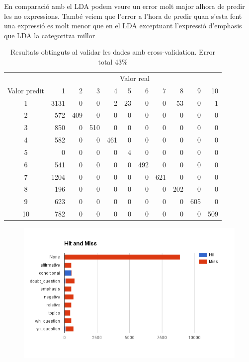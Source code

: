 \documentclass[a4paper]{article}
\begin{document}
En comparació amb el LDA podem veure un error molt major alhora de predir les no expressions. També veiem que l’error a l’hora de predir quan s’esta fent una expressió es molt menor que en el LDA exceptuant l’expressió d’emphasis que LDA la categoritza millor

\begin{table}[H]
	\centering
	\def\arraystretch{1.2}
	\begin{tabular}{|c|rrrrrrrrrr|}
		\hline
		& \multicolumn{10}{c|}{Valor real} \\
		Valor predit & 1 & 2 & 3 & 4 & 5 & 6 & 7 & 8 & 9 & 10 \\
		\hline
		1 & 3131 & 0 & 0 & 2 & 23 & 0 & 0 & 53 & 0 & 1 \\
		2 & 572 & 409 & 0 & 0 & 0 & 0 & 0 & 0 & 0 & 0 \\
		3 & 850 & 0 & 510 & 0 & 0 & 0 & 0 & 0 & 0 & 0 \\
		4 & 582 & 0 & 0 & 461 & 0 & 0 & 0 & 0 & 0 & 0 \\
		5 & 0 & 0 & 0 & 0 & 4 & 0 & 0 & 0 & 0 & 0 \\
		6 & 541 & 0 & 0 & 0 & 0 & 492 & 0 & 0 & 0 & 0 \\
		7 & 1204 & 0 & 0 & 0 & 0 & 0 & 621 & 0 & 0 & 0 \\
		8 & 196 & 0 & 0 & 0 & 0 & 0 & 0 & 202 & 0 & 0 \\
		9 & 623 & 0 & 0 & 0 & 0 & 0 & 0 & 0 & 605 & 0 \\
		10 & 782 & 0 & 0 & 0 & 0 & 0 & 0 & 0 & 0 & 509 \\
		\hline
	\end{tabular}
	\caption{Resultats obtinguts al validar les dades amb cross-validation. Error total 43\%}
\end{table}

\begin{figure}[H]
	\centering
	\includegraphics[width=\textwidth]{images/image02}
\end{figure}
\end{document}
